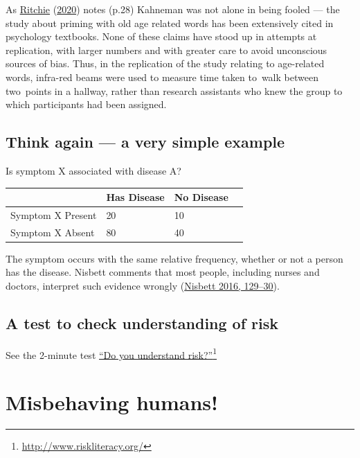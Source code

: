 \documentclass[
  10pt,
  b5paper]{book}
\begin{document}
As \protect\hyperlink{ref-ritchie2020science}{Ritchie} (\protect\hyperlink{ref-ritchie2020science}{2020}) notes (p.28) Kahneman was not alone
in being fooled --- the study about priming with old age
related words has been extensively cited in
psychology textbooks. None of these claims have stood up
in attempts at replication, with larger numbers and with
greater care to avoid unconscious sources of bias. Thus,
in the replication of the study relating to age-related
words, infra-red beams were used to measure time taken
to~walk between two~points in a hallway, rather than
research assistants who knew the group to which
participants had been assigned.

\hypertarget{think-again-a-very-simple-example}{%
\subsection*{Think again --- a very simple example}\label{think-again-a-very-simple-example}}

Is symptom X associated with disease A?

\begin{longtable}[]{@{}llll@{}}
\toprule
& Has Disease & No Disease & \\
\midrule
\endhead
Symptom X Present & 20 & 10 & \\
Symptom X Absent & 80 & 40 & \\
\bottomrule
\end{longtable}

The symptom occurs with the same relative frequency, whether or
not a person has the disease.
Nisbett comments that most people, including nurses and doctors,
interpret such evidence wrongly (\protect\hyperlink{ref-nisbett}{Nisbett 2016, 129--30}).

\hypertarget{a-test-to-check-understanding-of-risk}{%
\subsection*{A test to check understanding of risk}\label{a-test-to-check-understanding-of-risk}}

See the 2-minute test
\href{http://www.riskliteracy.org/}{``Do you understand risk?''}\footnote{\url{http://www.riskliteracy.org/}}

\hypertarget{misbehaving-humans}{%
\section{Misbehaving humans!}\label{misbehaving-humans}}
\end{document}
